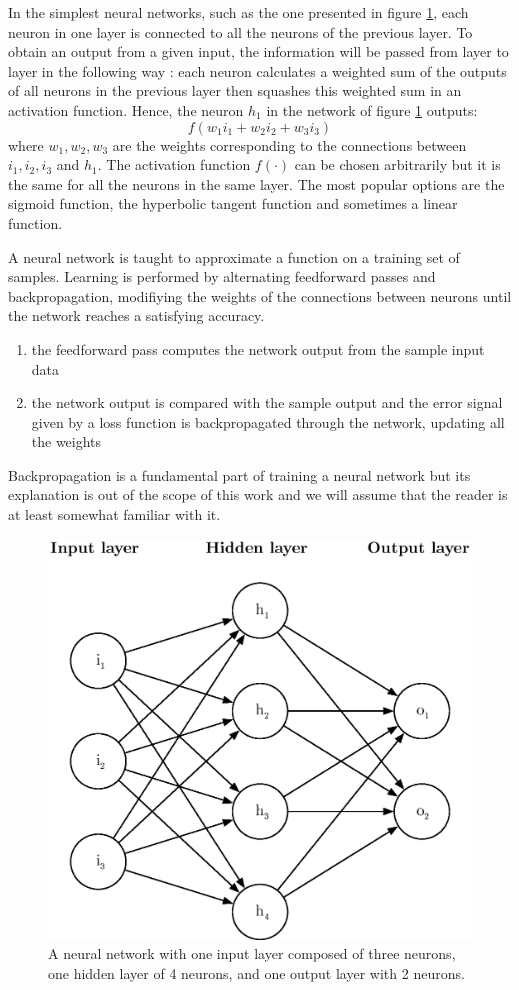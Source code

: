 In the simplest neural networks, such as the one presented in figure 
\ref{fig:neural_network}, each neuron in one layer is connected to all the
neurons of the previous layer. To obtain an output from a given input,
the information will be passed from layer to layer in the following way : 
each neuron calculates a weighted sum of the outputs of all neurons in the
previous layer then squashes this weighted sum in an activation function. 
Hence, the neuron $h_1$ in the network of figure \ref{fig:neural_network}
outputs:
$$ f(w_1i_1 + w_2i_2 + w_3i_3) $$
where $w_1, w_2, w_3$ are the weights corresponding to the connections between
$i_1, i_2, i_3$ and $h_1$. The activation function $f(\cdot)$ can be chosen 
arbitrarily but it is
the same for all the neurons in the same layer. The most popular options are
the sigmoid function, the hyperbolic tangent function and sometimes a linear
function.

A neural network is taught to approximate a function on a training
set of samples. Learning is performed by alternating feedforward passes and 
backpropagation, modifiying the weights of the connections between neurons until
the network reaches a satisfying accuracy.

\begin{enumerate}
	\item the feedforward pass computes the network output from the sample
		input data
	\item the network output is compared with the sample output and the
		error signal given by a loss function
		is backpropagated through the network, updating
		all the weights
\end{enumerate}

Backpropagation is a fundamental part of training a neural network but its
explanation is out of the scope of this work and we will assume that the
reader is at least somewhat familiar with it.

\begin{figure}[]
	\centering
	\includegraphics[width=0.6\linewidth]{fig/neural_network.eps}
	\caption{A neural network with one input layer composed of three neurons,
	one hidden layer of 4 neurons, and one output layer with 2 neurons.}
	\label{fig:neural_network}
\end{figure}


